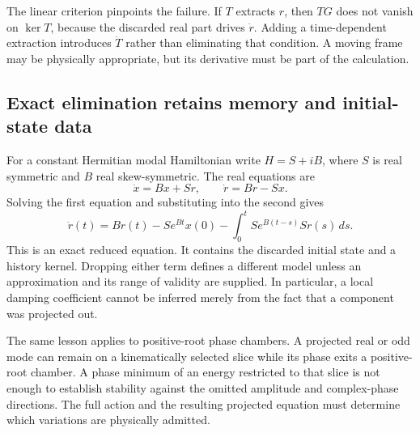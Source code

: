 The linear criterion pinpoints the failure. If $T$ extracts $r$,
then $TG$ does not vanish on $\ker T$, because the discarded real
part drives $\dot r$. Adding a time-dependent extraction introduces
$\dot T$ rather than eliminating that condition. A moving frame may
be physically appropriate, but its derivative must be part of the
calculation.

\subsection{Exact elimination retains memory and initial-state data}
For a constant Hermitian modal Hamiltonian write
$H=S+iB$, where $S$ is real symmetric and $B$ real skew-symmetric.
The real equations are
\begin{equation}
 \dot x=Bx+Sr,\qquad\dot r=Br-Sx.
\end{equation}
Solving the first equation and substituting into the second gives
\begin{equation}
 \dot r(t)=Br(t)-Se^{Bt}x(0)
       -\int_0^tSe^{B(t-s)}Sr(s)\,ds.
\end{equation}
This is an exact reduced equation. It contains the discarded initial
state and a history kernel. Dropping either term defines a different
model unless an approximation and its range of validity are supplied.
In particular, a local damping coefficient cannot be inferred merely
from the fact that a component was projected out.

The same lesson applies to positive-root phase chambers. A projected
real or odd mode can remain on a kinematically selected slice while
its phase exits a positive-root chamber. A phase minimum of an energy
restricted to that slice is not enough to establish stability against
the omitted amplitude and complex-phase directions. The full action
and the resulting projected equation must determine which variations
are physically admitted.

